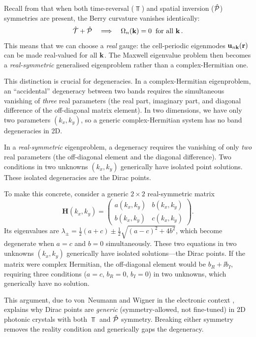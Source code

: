 Recall from  that when both time-reversal
($\Top$) and spatial inversion ($\hat{\mathcal{P}}$) symmetries are present, the
Berry curvature vanishes identically:
\begin{equation}\label{eq:ch6-zero-curvature}
  \hat{\mathcal{T}} + \hat{\mathcal{P}} \quad\Longrightarrow\quad
  \Omega_n(\mathbf{k}) = 0\;\;\text{for all } \mathbf{k}\,.
\end{equation}
This means that we can choose a \emph{real} gauge: the cell-periodic
eigenmodes $\mathbf{u}_{n\mathbf{k}}(\mathbf{r})$ can be made real-valued for all
$\mathbf{k}$.  The Maxwell eigenvalue problem then becomes a
\emph{real-symmetric} generalised eigenproblem rather than a
complex-Hermitian one.

This distinction is crucial for degeneracies.  In a complex-Hermitian
eigenproblem, an ``accidental'' degeneracy between two bands requires
the simultaneous vanishing of \emph{three} real parameters (the real
part, imaginary part, and diagonal difference of the off-diagonal matrix
element).  In two dimensions, we have only two parameters $(k_x,k_y)$,
so a generic complex-Hermitian system has no band degeneracies in 2D.

In a \emph{real-symmetric} eigenproblem, a degeneracy requires the
vanishing of only \emph{two} real parameters (the off-diagonal element
and the diagonal difference).  Two conditions in two unknowns
$(k_x,k_y)$ generically have isolated point solutions.  These isolated
degeneracies are the Dirac points.

To make this concrete, consider a generic $2\times 2$ real-symmetric
matrix
\begin{equation}\label{eq:ch6-vNW-matrix}
  \mathbf{H}(k_x,k_y)
  = \begin{pmatrix}
    a(k_x,k_y) & b(k_x,k_y) \\
    b(k_x,k_y) & c(k_x,k_y)
  \end{pmatrix}.
\end{equation}
Its eigenvalues are
$\lambda_\pm = \frac{1}{2}(a+c)\pm\frac{1}{2}\sqrt{(a-c)^2+4b^2}$,
which become degenerate when $a=c$ and $b=0$ simultaneously.  These two
equations in two unknowns $(k_x,k_y)$ generically have isolated
solutions---the Dirac points.  If the matrix were complex Hermitian,
the off-diagonal element would be $b_R+\ii b_I$, requiring three
conditions ($a=c$, $b_R=0$, $b_I=0$) in two unknowns, which generically
have no solution.

\begin{remark}
This argument, due to von~Neumann and Wigner in the electronic context
\cite{ozawa2018topological},
explains why Dirac points are \emph{generic} (symmetry-allowed, not
fine-tuned) in 2D photonic crystals with both $\Top$ and $\hat{\mathcal{P}}$
symmetry.  Breaking either symmetry removes the reality condition and
generically gaps the degeneracy.
\end{remark}

